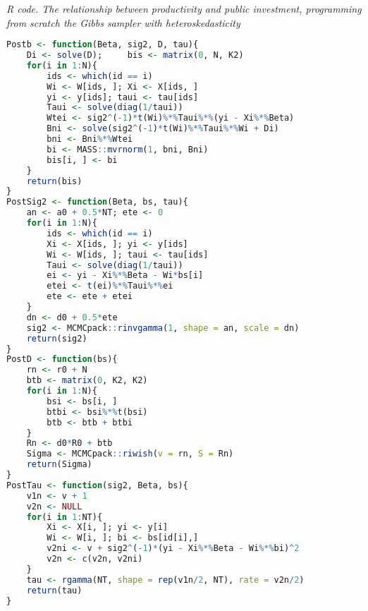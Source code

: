 \begin{enumerate}[leftmargin=*]
\begin{tcolorbox}[enhanced,width=4.67in,center upper,
	fontupper=\large\bfseries,drop shadow southwest,sharp corners]
	\textit{R code. The relationship between productivity and public investment, programming from scratch the Gibbs sampler with heteroskedasticity}
	\begin{VF}
		\begin{lstlisting}[language=R]
Postb <- function(Beta, sig2, D, tau){
	Di <- solve(D); 	bis <- matrix(0, N, K2)
	for(i in 1:N){
		ids <- which(id == i)
		Wi <- W[ids, ]; Xi <- X[ids, ]
		yi <- y[ids]; taui <- tau[ids]
		Taui <- solve(diag(1/taui))
		Wtei <- sig2^(-1)*t(Wi)%*%Taui%*%(yi - Xi%*%Beta)
		Bni <- solve(sig2^(-1)*t(Wi)%*%Taui%*%Wi + Di)
		bni <- Bni%*%Wtei
		bi <- MASS::mvrnorm(1, bni, Bni)
		bis[i, ] <- bi
	}
	return(bis)
}
PostSig2 <- function(Beta, bs, tau){
	an <- a0 + 0.5*NT; ete <- 0
	for(i in 1:N){
		ids <- which(id == i)
		Xi <- X[ids, ]; yi <- y[ids]
		Wi <- W[ids, ]; taui <- tau[ids]
		Taui <- solve(diag(1/taui))
		ei <- yi - Xi%*%Beta - Wi*bs[i]
		etei <- t(ei)%*%Taui%*%ei
		ete <- ete + etei
	}
	dn <- d0 + 0.5*ete 
	sig2 <- MCMCpack::rinvgamma(1, shape = an, scale = dn)
	return(sig2)
}
PostD <- function(bs){
	rn <- r0 + N
	btb <- matrix(0, K2, K2)
	for(i in 1:N){
		bsi <- bs[i, ]
		btbi <- bsi%*%t(bsi)
		btb <- btb + btbi
	}
	Rn <- d0*R0 + btb
	Sigma <- MCMCpack::riwish(v = rn, S = Rn)
	return(Sigma)
}
PostTau <- function(sig2, Beta, bs){
	v1n <- v + 1
	v2n <- NULL
	for(i in 1:NT){
		Xi <- X[i, ]; yi <- y[i]
		Wi <- W[i, ]; bi <- bs[id[i],]
		v2ni <- v + sig2^(-1)*(yi - Xi%*%Beta - Wi%*%bi)^2
		v2n <- c(v2n, v2ni)
	}
	tau <- rgamma(NT, shape = rep(v1n/2, NT), rate = v2n/2)
	return(tau)
}
\end{lstlisting}
	\end{VF}
\end{tcolorbox}



\end{enumerate}
